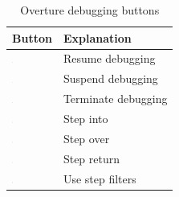 \documentclass{overturerepchap}
\begin{document}

\begin{table}
\begin{center}
\caption{Overture debugging buttons\label{tab:debugButtons}}
\begin{tabular}{|l|l|}\hline \hline
\textbf{Button} & \textbf{Explanation} \\ \hline
\includegraphics[width=0.03\textwidth]{figures/resume} & Resume
debugging\index{icon!resume debugging} \\
\includegraphics[width=0.03\textwidth]{figures/suspend} & Suspend
debugging\index{icon!suspend debugging}\\
\includegraphics[width=0.03\textwidth]{figures/terminate} & Terminate
debugging\index{icon!terminate debugging}\\
\includegraphics[width=0.03\textwidth]{figures/stepinto} & Step
into\index{icon!step into}\\
\includegraphics[width=0.03\textwidth]{figures/stepover} & Step
over\index{icon!step over} \\
\includegraphics[width=0.03\textwidth]{figures/stepreturn} & Step
return\index{icon!step return}\\
\includegraphics[width=0.03\textwidth]{figures/stepbystep} & Use step
filters\index{icon!use step filters}\\
\hline \hline
\end{tabular}
\end{center}
\end{table}
\end{document}
